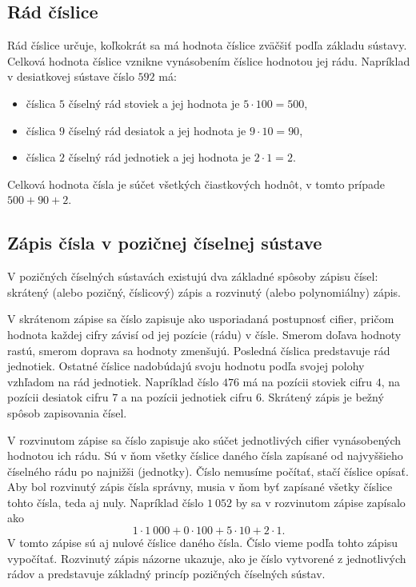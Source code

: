 \documentclass{article}
\begin{document}
\subsection{Rád číslice}

Rád číslice určuje, koľkokrát sa má hodnota číslice zväčšiť podľa základu sústavy. Celková hodnota číslice vznikne vynásobením číslice hodnotou jej rádu. Napríklad v desiatkovej sústave číslo \(592\) má:
\begin{itemize}
  \item číslica \(5\) číselný rád stoviek a jej hodnota je \(5 \cdot 100 = 500\),
  \item číslica \(9\) číselný rád desiatok a jej hodnota je \(9 \cdot 10 = 90\),
  \item číslica \(2\) číselný rád jednotiek a jej hodnota je \(2 \cdot 1 = 2\).
\end{itemize}
Celková hodnota čísla je súčet všetkých čiastkových hodnôt, v tomto prípade \(500 + 90 + 2\).

\subsection{Zápis čísla v pozičnej číselnej sústave}

V pozičných číselných sústavách existujú dva základné spôsoby zápisu čísel: skrátený (alebo pozičný, číslicový) zápis a rozvinutý (alebo polynomiálny) zápis.

V skrátenom zápise sa číslo zapisuje ako usporiadaná postupnosť cifier, pričom hodnota každej cifry závisí od jej pozície (rádu) v čísle. Smerom doľava hodnoty rastú, smerom doprava sa hodnoty zmenšujú. Posledná číslica predstavuje rád jednotiek. Ostatné číslice nadobúdajú svoju hodnotu podľa svojej polohy vzhľadom na rád jednotiek. Napríklad číslo \(476\) má na pozícii stoviek cifru \(4\), na pozícii desiatok cifru \(7\) a na pozícii jednotiek cifru \(6\). Skrátený zápis je bežný spôsob zapisovania čísel.

V rozvinutom zápise sa číslo zapisuje ako súčet jednotlivých cifier vynásobených hodnotou ich rádu. Sú v ňom všetky číslice daného čísla zapísané od najvyššieho číselného rádu po najnižši (jednotky). Číslo nemusíme počítať, stačí číslice opísať. Aby bol rozvinutý zápis čísla správny, musia v ňom byť zapísané všetky číslice tohto čísla, teda aj nuly. Napríklad číslo \(1\ 052\) by sa v rozvinutom zápise zapísalo ako
\[
1 \cdot 1\ 000 + 0 \cdot 100 + 5 \cdot 10 + 2 \cdot 1.
\]
V tomto zápise sú aj nulové číslice daného čísla. Číslo vieme podľa tohto zápisu vypočítať. Rozvinutý zápis názorne ukazuje, ako je číslo vytvorené z jednotlivých rádov a predstavuje základný princíp pozičných číselných sústav.
\end{document}

